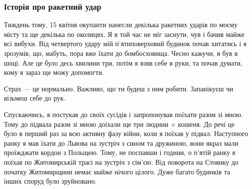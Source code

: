  
 
 
 
 

\subsubsection{Історія про ракетний удар}
\label{sec:25_04_2022.stz.pc.ua.dou.1.geroizm_pogljad_kapellana.2.raketnyj_udar}

Тиждень тому, 15 квітня окупанти нанесли декілька ракетних ударів по моєму
місту та ще декілька по околицях. Я в той час не міг заснути, чув і бачив майже
всі вибухи. Від четвертого удару мій п'ятиповерховий будинок почав хитатись і я
зрозумів, що, мабуть, пора вже їхати до бомбосховища. Чесно кажучи, я був в
шоці. Але це було десь хвилини три, потім я взяв себе в руки, та почав думати,
кому я зараз ще можу допомогти.

Страх — це нормально. Важливо, що ти будеш з ним робити. Запанікуєш чи візьмеш
себе до рук.


Спускаючись, я постукав до своїх сусідів і запропонував поїхати разом зі мною.
Тому до підвала разом зі мною доїхали ще три людини + кошеня. До речі це було в
перший раз за всю активну фазу війни, коли я поїхав у підвал. Наступного ранку
я мав їхати до Львова на зустріч з сином та дружиною, вони якраз мали
проїжджати кордон з Польщею. Тому, не поспавши і години, о п'ятій ранку я
поїхав по Житомирській трасі на зустріч з сім'єю. Від поворота на Стоянку до
початку Житомирщини немає майже нічого цілого. Дуже багато будинків та інших
споруд було зруйновано.
